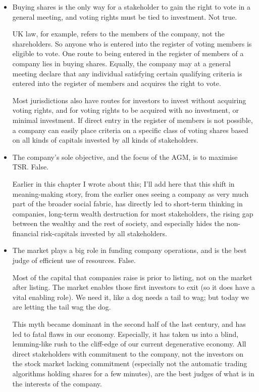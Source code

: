\begin{itemize}
\item Buying shares is the only way for a stakeholder to gain the right to vote in a general meeting, and voting rights must be tied to investment. Not true.


UK law, for example, refers to the members of the company, not the shareholders. So anyone who is entered into the register of voting members is eligible to vote\cite{mcgaughey}. One route to being entered in the register of members of a company lies in buying shares. Equally, the company may at a general meeting declare that any individual satisfying certain qualifying criteria is entered into the register of members and acquires the right to vote.


Most jurisdictions also have routes for investors to invest without acquiring voting rights, and for voting rights to be acquired with no investment, or minimal investment. If direct entry in the register of members is not possible, a company can easily place criteria on a specific class of voting shares based on all kinds of capitals invested by all kinds of stakeholders.


\item The company’s sole objective, and the focus of the AGM, is to maximise TSR. False.


Earlier in this chapter I wrote about this; I’ll add here that this shift in meaning\hyp{}making story, from the earlier ones seeing a company as very much part of the broader social fabric, has directly led to short-term thinking in companies, long-term wealth destruction for most stakeholders, the rising gap between the wealthy and the rest of society, and especially hides the non-financial risk-capitals invested by all stakeholders. 


\item The market plays a big role in funding company operations, and is the best judge of efficient use of resources. False.


Most of the capital that companies raise is prior to listing, not on the market after listing. The market enables those first investors to exit (so it does have a vital enabling role). We need it, like a dog needs a tail to wag; but today we are letting the tail wag the dog.


This myth became dominant in the second half of the last century, and has led to fatal flaws in our economy. Especially, it has taken us into a blind, lemming-like rush to the cliff-edge of our current degenerative economy. All direct stakeholders with commitment to the company, not the investors on the stock market lacking commitment (especially not the automatic trading algorithms holding shares for a few minutes), are the best judges of what is in the interests of the company.



\end{itemize}
